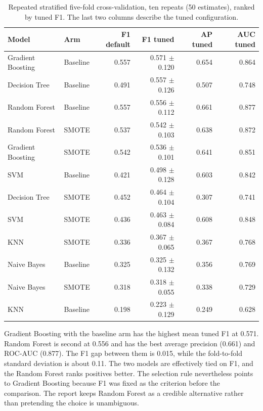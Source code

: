 \begin{table}[H]
    \centering
    \caption{Repeated stratified five-fold cross-validation, ten repeats (50 estimates), ranked by tuned F1. The last two columns describe the tuned configuration.}
    \label{tab:cv-results}
    \small
    \begin{tabular}{@{}l l r r r r@{}}
        \toprule
        \textbf{Model} & \textbf{Arm} & \textbf{F1 default} & \textbf{F1 tuned} & \textbf{AP tuned} & \textbf{AUC tuned} \\
        \midrule
        Gradient Boosting & Baseline & 0.557 & 0.571 $\pm$ 0.120 & 0.654 & 0.864 \\
        Decision Tree & Baseline & 0.491 & 0.557 $\pm$ 0.126 & 0.507 & 0.748 \\
        Random Forest & Baseline & 0.557 & 0.556 $\pm$ 0.112 & 0.661 & 0.877 \\
        Random Forest & SMOTE & 0.537 & 0.542 $\pm$ 0.103 & 0.638 & 0.872 \\
        Gradient Boosting & SMOTE & 0.542 & 0.536 $\pm$ 0.101 & 0.641 & 0.851 \\
        SVM & Baseline & 0.421 & 0.498 $\pm$ 0.128 & 0.603 & 0.842 \\
        Decision Tree & SMOTE & 0.452 & 0.464 $\pm$ 0.104 & 0.307 & 0.741 \\
        SVM & SMOTE & 0.436 & 0.463 $\pm$ 0.084 & 0.608 & 0.848 \\
        KNN & SMOTE & 0.336 & 0.367 $\pm$ 0.065 & 0.367 & 0.768 \\
        Naive Bayes & Baseline & 0.325 & 0.325 $\pm$ 0.132 & 0.356 & 0.769 \\
        Naive Bayes & SMOTE & 0.318 & 0.318 $\pm$ 0.055 & 0.338 & 0.729 \\
        KNN & Baseline & 0.198 & 0.223 $\pm$ 0.129 & 0.249 & 0.628 \\
        \bottomrule
    \end{tabular}
\end{table}

Gradient Boosting with the baseline arm has the highest mean tuned F1 at 0.571. Random Forest is second at 0.556 and has the best average precision (0.661) and ROC-AUC (0.877). The F1 gap between them is 0.015, while the fold-to-fold standard deviation is about 0.11. The two models are effectively tied on F1, and the Random Forest ranks positives better. The selection rule nevertheless points to Gradient Boosting because F1 was fixed as the criterion before the comparison. The report keeps Random Forest as a credible alternative rather than pretending the choice is unambiguous.

